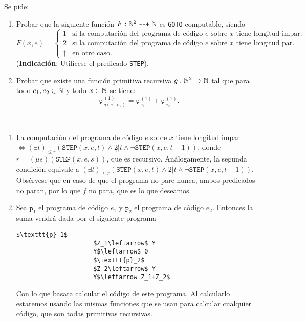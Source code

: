 \documentclass[twoside]{article}
\begin{document}
\begin{ejercicio}{2}
Se pide:
\begin{enumerate}
\item Probar que la siguiente función $F : \mathbb{N}^2\dashrightarrow \mathbb{N}$ es \texttt{GOTO}-computable, siendo
\[
F(x,e)=\begin{cases}
1 & \text{si la computación del programa de código }e\text{ sobre }x\text{ tiene longitud impar}.\\
2 & \text{si la computación del programa de código }e\text{ sobre }x\text{ tiene longitud par}.\\
\uparrow & \text{en otro caso}.
\end{cases}
\]
(\textbf{Indicación}: Utilícese el predicado \texttt{STEP}).
\item Probar que existe una función primitiva recursiva $g : \mathbb{N}^2 \to \mathbb{N}$ tal que para todo
$e_1, e_2 \in \mathbb{N}$ y todo $x \in \mathbb{N}$ se tiene:
$$\varphi_{g(e_1,e_2)}^{(1)}=\varphi_{e_1}^{(1)}+\varphi_{e_2}^{(1)}.$$
\end{enumerate}
\end{ejercicio}
\begin{solucion}\
\begin{enumerate}
\item La computación del programa de código $e$ sobre $x$ tiene longitud impar$\Leftrightarrow (\exists t)_{\leq r}(\texttt{STEP}(x,e,t)\land 2\not| t\land\neg \texttt{STEP}(x,e,t-1))$, donde $r=(\mu s)(\texttt{STEP}(x,e,s))$, que es recursivo. Análogamente, la segunda condición equivale a $(\exists t)_{\leq r}(\texttt{STEP}(x,e,t)\land 2| t\land\neg \texttt{STEP}(x,e,t-1))$. Obsérvese que en caso de que el programa no pare nunca, ambos predicados no paran, por lo que $f$ no para, que es lo que deseamos.
\item Sea $\texttt{p}_1$ el programa de código $e_1$ y $\texttt{p}_2$ el programa de código $e_2.$ Entonces la suma vendrá dada por el siguiente programa
\begin{lstlisting}[mathescape=true]
                     $\texttt{p}_1$
                     $Z_1\leftarrow$ Y
                     Y$\leftarrow$ 0
                     $\texttt{p}_2$
                     $Z_2\leftarrow$ Y
                     Y$\leftarrow Z_1+Z_2$
\end{lstlisting}
Con lo que basata calcular el código de este programa. Al calcularlo estaremos usando las mismas funciones que se usan para calcular cualquier código, que son todas primitivas recursivas.
\end{enumerate}
\end{solucion}
\end{document}
